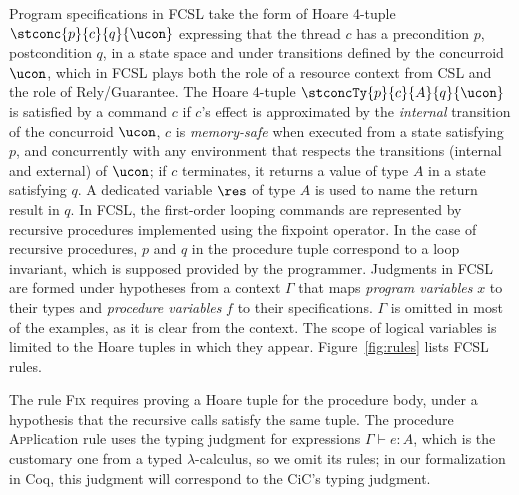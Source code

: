 Program specifications in FCSL take the form of Hoare 4-tuple
$\stconc{p}{c}{q}{\ucon}$ expressing that the thread $c$ has a
precondition $p$, postcondition $q$, in a state space and under
transitions defined by the concurroid $\ucon$, which in FCSL plays
both the role of a resource context from CSL and the role of
Rely/Guarantee. The Hoare 4-tuple $\stconcTy{p}{c}{A}{q}{\ucon}$ is
satisfied by a command $c$ if $c$'s effect is approximated by the
\emph{internal} transition of the concurroid $\ucon$, $c$ is
\emph{memory-safe} when executed from a state satisfying $p$, and
concurrently with any environment that respects the transitions
(internal and external) of $\ucon$; if $c$ terminates, it returns a
value of type $A$ in a state satisfying $q$. A dedicated variable
$\res$ of type $A$ is used to name the return result in $q$.
%
In FCSL, the first-order looping commands are represented by recursive
procedures implemented using the fixpoint operator. In the case of
recursive procedures, $p$ and $q$ in the procedure tuple correspond to
a loop invariant, which is supposed provided by the programmer.
%
Judgments in FCSL are formed under hypotheses from a context $\Gamma$
that maps \emph{program variables} $x$ to their types and
\emph{procedure variables} $f$ to their specifications. $\Gamma$ is
omitted in most of the examples, as it is clear from the context. The
scope of logical variables is limited to the Hoare tuples in which
they appear.
%
Figure~\ref{fig:rules} lists FCSL rules.

The rule \textsc{Fix} requires proving a Hoare tuple for the procedure
body, under a hypothesis that the recursive calls satisfy the same
tuple. The procedure \textsc{App}lication rule uses the typing
judgment for expressions $\Gamma \vdash e : A$, which is the customary
one from a typed $\lambda$-calculus, so we omit its rules; in our
formalization in Coq, this judgment will correspond to the CiC's
typing judgment.

